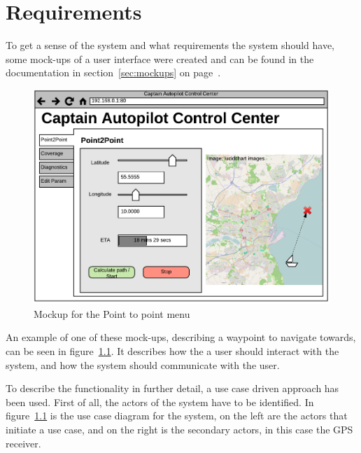 \chapter{Requirements}
To get a sense of the system and what requirements the system should have, some mock-ups of a user interface were created and can be found in the documentation in section~\ref{sec:mockups} on page~\pageref{sec:mockups}.

\begin{figure}[H]
\centering
\includegraphics[width=0.7\linewidth]{../Appendix/Project/Dokumentation/Images/Requirements_specification/UI_Mockup_Point_to_point}
\caption{Mockup for the Point to point menu}
\label{fig:uimockuppointtopoint}
\end{figure}

An example of one of these mock-ups, describing a waypoint to navigate towards, can be seen in figure~\ref{fig:uimockuppointtopoint}. It describes how the a user should interact with the system, and how the system should communicate with the user.

To describe the functionality in further detail, a use case driven approach has been used. First of all, the actors of the system have to be identified. In figure~\ref{fig:uimockuppointtopoint} is the use case diagram for the system, on the left are the actors that initiate a use case, and on the right is the secondary actors, in this case the GPS receiver.

